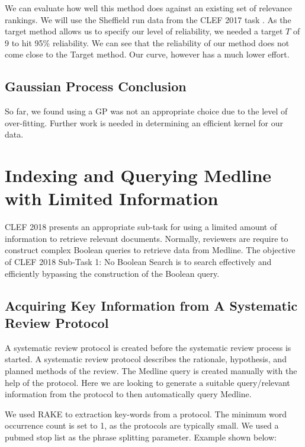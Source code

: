 We can evaluate how well this method does against an existing set of relevance rankings. We will use the Sheffield run data from the CLEF 2017 task \cite{Kanoulas12017}. As the target method allows us to specify our level of reliability, we needed a target $T$ of 9 to hit 95\% reliability. We can see that the reliability of our method does not come close to the Target method. Our curve, however has a much lower effort.

\subsection{Gaussian Process Conclusion}

So far, we found using a GP was not an appropriate choice due to the level of over-fitting. Further work is needed in determining an efficient kernel for our data.


\section{Indexing and Querying Medline with Limited Information}


CLEF 2018 \cite{CLEFLINK} presents an appropriate sub-task for using a limited amount of information to retrieve relevant documents. Normally, reviewers are require to construct complex Boolean queries to retrieve data from Medline. The objective of CLEF 2018 Sub-Task 1: No Boolean Search \cite{CLEFLINK} is to search effectively and efficiently bypassing the construction of the Boolean query.

\subsection{Acquiring Key Information from A Systematic Review Protocol}

A systematic review protocol is created before the systematic review process is started. A systematic review protocol describes the rationale, hypothesis, and planned methods of the review. The Medline query is created manually with the help of the protocol. Here we are looking to generate a suitable query/relevant information from the protocol to then automatically query Medline.

We used RAKE \cite{rake} to extraction key-words from a protocol. The minimum word occurrence count is set to 1, as the protocols are typically small. We used a pubmed stop list as the phrase splitting parameter. Example shown below:

